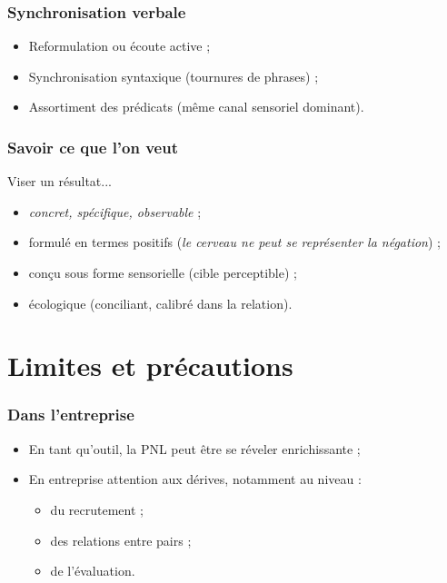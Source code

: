 \documentclass{beamer}
\begin{document}
\begin{frame}
\frametitle{Synchronisation verbale}
	\begin{itemize}
		\item Reformulation ou écoute active ;
		\item Synchronisation syntaxique (tournures de phrases) ;
		\item Assortiment des prédicats (même canal sensoriel dominant).
	\end{itemize}
\end{frame}

\begin{frame}
\frametitle{Savoir ce que l'on veut}
	\begin{block}{Viser un résultat...}
		\begin{itemize}
			\item \emph{concret, spécifique, observable} ;
			\item formulé en termes positifs (\emph{le cerveau ne peut se représenter la négation}) ;
			\item conçu sous forme sensorielle (cible perceptible) ;
			\item écologique (conciliant, calibré dans la relation).
		\end{itemize}
	\end{block}
\end{frame}

\section{Limites et précautions}

\begin{frame}
\frametitle{Dans l'entreprise}
	\begin{itemize}
		\item<+-> En tant qu'outil, la PNL peut être se réveler enrichissante ;
		\item<+-> En entreprise attention aux dérives, notamment au niveau :
			\begin{itemize}
				\item du recrutement ;
				\item des relations entre pairs ;
				\item de l'évaluation.
			\end{itemize}
	\end{itemize}
\end{frame}
\end{document}
